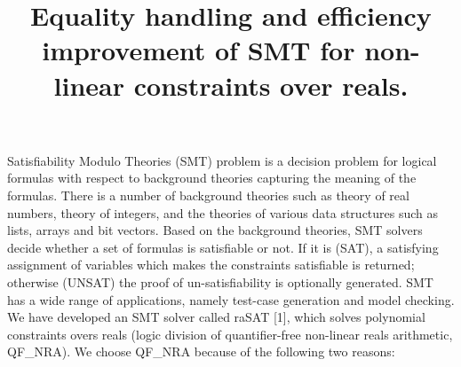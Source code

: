 \documentclass[12pt]{article}
\title{Equality handling and efficiency improvement of SMT for non-linear constraints over reals.}
\begin{document}
\maketitle
Satisfiability Modulo Theories (SMT) problem is a decision problem for logical formulas with respect to background theories capturing the meaning of the formulas. There is a number of background theories such as theory of real numbers, theory of integers, and the theories of various data structures such as lists, arrays and bit vectors. Based on the background theories, SMT solvers decide whether a set of formulas is satisfiable or not. If it is (SAT), a satisfying assignment of variables which makes the constraints satisfiable is returned; otherwise (UNSAT) the proof of un-satisfiability is optionally generated. SMT has a wide range of applications, namely test-case generation and model checking. We have developed an SMT solver called raSAT [1], which solves polynomial constraints overs reals (logic division of quantifier-free non-linear reals arithmetic, QF\_NRA). We choose QF\_NRA because of the following two reasons:
\end{document}
